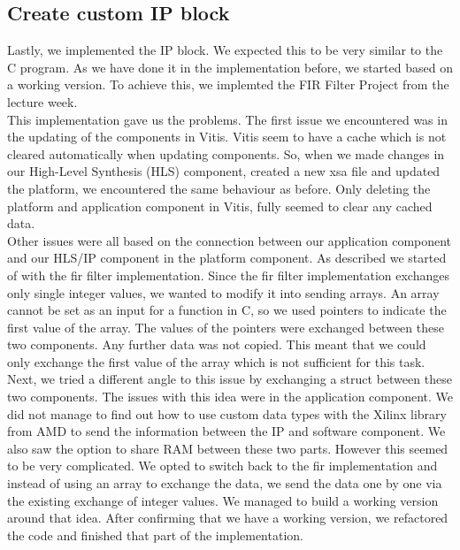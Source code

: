 \documentclass[conference]{IEEEtran}
\begin{document}
\subsection{Create custom IP block}
Lastly, we implemented the IP block. We expected this to be very similar to the C program. As we have done it in the implementation before, we started based on a working version. To achieve this, we implemted the FIR Filter Project from the lecture week. \\
This implementation gave us the problems. The first issue we encountered was in the updating of the components in Vitis. Vitis seem to have a cache which is not cleared automatically when updating components. So, when we made changes in our High-Level Synthesis (HLS) component, created a new xsa file and updated the platform, we encountered the same behaviour as before. Only deleting the platform and application component in Vitis, fully seemed to clear any cached data. \\
Other issues were all based on the connection between our application component and our HLS/IP component in the platform component. As described we started of with the fir filter implementation. Since the fir filter implementation exchanges only single integer values, we wanted to modify it into sending arrays. An array cannot be set as an input for a function in C, so we used pointers to indicate the first value of the array. The values of the pointers were exchanged between these two components. Any further data was not copied. This meant that we could only exchange the first value of the array which is not sufficient for this task. Next, we tried a different angle to this issue by exchanging a struct between these two components. The issues with this idea were in the application component. We did not manage to find out how to use custom data types with the Xilinx library from AMD to send the information between the IP and software component. We also saw the option to share RAM between these two parts. However this seemed to be very complicated. We opted to switch back to the fir implementation and instead of using an array to exchange the data, we send the data one by one via the existing exchange of integer values. We managed to build a working version around that idea. After confirming that we have a working version, we refactored the code and finished that part of the implementation. \\
\end{document}
